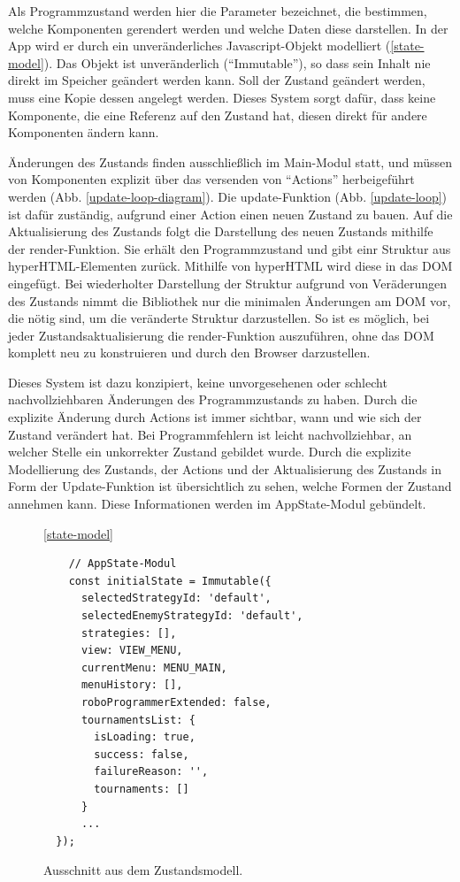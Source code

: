 Als Programmzustand werden hier die Parameter bezeichnet, die bestimmen, welche Komponenten
gerendert werden und welche Daten diese darstellen. In der App wird er durch ein unveränderliches
Javascript-Objekt modelliert (\ref{state-model}). Das Objekt ist unveränderlich
(\enquote{Immutable}), so dass sein Inhalt nie direkt im Speicher geändert werden kann. Soll der
Zustand geändert werden, muss eine Kopie dessen angelegt werden. Dieses System sorgt dafür, dass
keine Komponente, die eine Referenz auf den Zustand hat, diesen direkt für andere Komponenten ändern
kann.

Änderungen des Zustands finden ausschließlich im Main-Modul statt, und müssen von Komponenten
explizit über das versenden von \enquote{Actions} herbeigeführt werden (Abb.
\ref{update-loop-diagram}). Die update-Funktion (Abb. \ref{update-loop}) ist dafür zuständig,
aufgrund einer Action einen neuen Zustand zu bauen. Auf die Aktualisierung des Zustands folgt die
Darstellung des neuen Zustands mithilfe der render-Funktion. Sie erhält den Programmzustand und gibt
einr Struktur aus hyperHTML-Elementen zurück. Mithilfe von hyperHTML wird diese in das DOM
eingefügt. Bei wiederholter Darstellung der Struktur aufgrund von Veräderungen des Zustands nimmt
die Bibliothek nur die minimalen Änderungen am DOM vor, die nötig sind, um die veränderte Struktur
darzustellen. So ist es möglich, bei jeder Zustandsaktualisierung die render-Funktion auszuführen,
ohne das DOM komplett neu zu konstruieren und durch den Browser darzustellen.

Dieses System ist dazu konzipiert, keine unvorgesehenen oder schlecht nachvollziehbaren Änderungen
des Programmzustands zu haben. Durch die explizite Änderung durch Actions ist immer sichtbar, wann
und wie sich der Zustand verändert hat. Bei Programmfehlern ist leicht nachvollziehbar, an welcher
Stelle ein unkorrekter Zustand gebildet wurde. Durch die explizite Modellierung des Zustands, der
Actions und der Aktualisierung des Zustands in Form der Update-Funktion ist übersichtlich zu sehen,
welche Formen der Zustand annehmen kann. Diese Informationen werden im AppState-Modul gebündelt.


\begin{figure}
  \caption{Ausschnitt aus dem Zustandsmodell.}

  \ref{state-model}

  \begin{lstlisting}
    // AppState-Modul
    const initialState = Immutable({
      selectedStrategyId: 'default',
      selectedEnemyStrategyId: 'default',
      strategies: [],
      view: VIEW_MENU,
      currentMenu: MENU_MAIN,
      menuHistory: [],
      roboProgrammerExtended: false,
      tournamentsList: {
        isLoading: true,
        success: false,
        failureReason: '',
        tournaments: []
      }
      ...
  });
  \end{lstlisting}
\end{figure}

